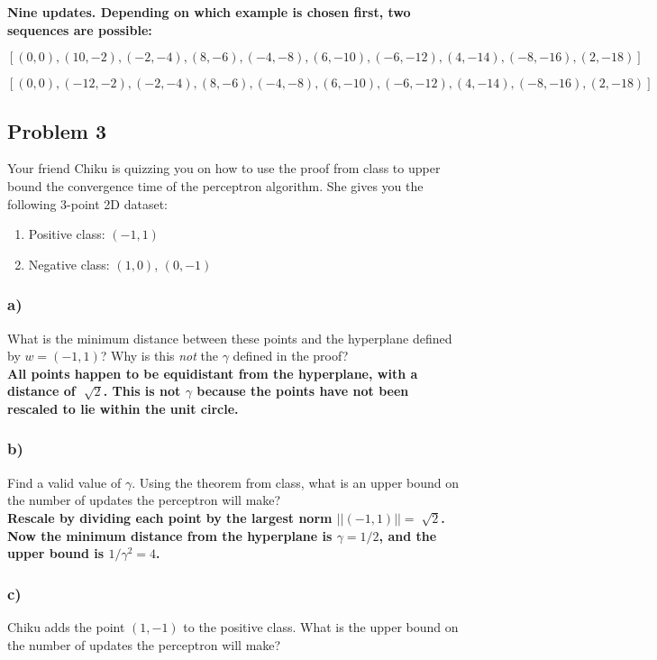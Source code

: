 \documentclass[a4paper]{article}
\begin{document}
\textbf{Nine updates. Depending on which example is chosen first, two sequences are possible:}

$[(0,0), (10,-2), (-2,-4), (8,-6), (-4,-8), (6,-10), (-6,-12), (4,-14), (-8,-16), (2,-18)]$

$[(0,0), (-12,-2), (-2,-4), (8,-6), (-4,-8), (6,-10), (-6,-12), (4,-14), (-8,-16), (2,-18)]$

\subsection*{Problem 3}
Your friend Chiku is quizzing you on how to use the proof from class to upper bound the convergence time of the perceptron algorithm. She gives you the following 3-point 2D dataset:
\begin{enumerate}
\item Positive class: $(-1, 1)$
\item Negative class: $(1,0)$, $(0,-1)$
\end{enumerate}
\subsubsection*{a)}
What is the minimum distance between these points and the hyperplane defined by $w=(-1,1)$? Why is this \textit{not} the $\gamma$ defined in the proof?\\

\textbf{All points happen to be equidistant from the hyperplane, with a distance of $\sqrt[]{2}$. This is not $\gamma$ because the points have not been rescaled to lie within the unit circle.}

\subsubsection*{b)}
Find a valid value of $\gamma$. Using the theorem from class, what is an upper bound on the number of updates the perceptron will make?\\

\textbf{Rescale by dividing each point by the largest norm $||(-1,1)||=\sqrt[]{2}$. Now the minimum distance from the hyperplane is $\gamma=1/2$, and the upper bound is $1/\gamma^2=4$.}

\subsubsection*{c)}
Chiku adds the point $(1,-1)$ to the positive class. What is the upper bound on the number of updates the perceptron will make?\\
\end{document}
